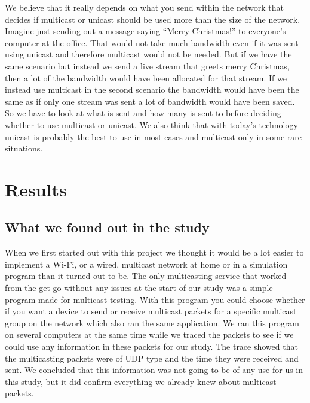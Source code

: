 \documentclass[9pt,a4paper]{acmproc}
\begin{document}
We believe that it really depends on what you send within the network that decides if multicast or unicast should be used more than the size of the network. Imagine just sending out a message saying “Merry Christmas!” to everyone's computer at the office. That would not take much bandwidth even if it was sent using unicast and therefore multicast would not be needed. But if we have the same scenario but instead we send a live stream that greets merry Christmas, then a lot of the bandwidth would have been allocated for that stream. If we instead use multicast in the second scenario the bandwidth would have been the same as if only one stream was sent a lot of bandwidth would have been saved. So we have to look at what is sent and how many is sent to before deciding whether to use multicast or unicast. We also think that with today's technology unicast is probably the best to use in most cases and multicast only in some rare situations. \cite{multExplained} \cite{whatIsMult} \cite{understandIpMult} 


\clearpage

\section{Results}

\subsection{What we found out in the study}

When we first started out with this project we thought it would be a lot easier to implement a Wi-Fi, or a wired, multicast network at home or in a simulation program than it turned out to be. The only multicasting service that worked from the get-go without any issues at the start of our study was a simple program made for multicast testing. With this program you could choose whether if you want a device to send or receive multicast packets for a specific multicast group on the network which also ran the same application. We ran this program on several computers at the same time while we traced the packets to see if we could use any information in these packets for our study. The trace showed that the multicasting packets were of UDP type and the time they were received and sent. We concluded that this information was not going to be of any use for us in this study, but it did confirm everything we already knew about multicast packets.
\end{document}
